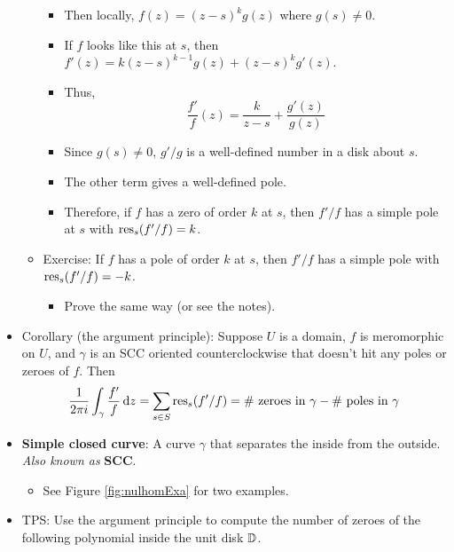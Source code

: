 \documentclass[../notes.tex]{subfiles}
\begin{document}
\begin{itemize}
\begin{itemize}
        \begin{itemize}
            \item Then locally, $f(z)=(z-s)^kg(z)$ where $g(s)\neq 0$.
            \item If $f$ looks like this at $s$, then $f'(z)=k(z-s)^{k-1}g(z)+(z-s)^kg'(z)$.
            \item Thus,
            \begin{equation*}
                \frac{f'}{f}(z) = \frac{k}{z-s}+\frac{g'(z)}{g(z)}
            \end{equation*}
            \item Since $g(s)\neq 0$, $g'/g$ is a well-defined number in a disk about $s$.
            \item The other term gives a well-defined pole.
            \item Therefore, if $f$ has a zero of order $k$ at $s$, then $f'/f$ has a simple pole at $s$ with $\operatorname{res}_s(f'/f)=k$.
        \end{itemize}
        \item Exercise: If $f$ has a pole of order $k$ at $s$, then $f'/f$ has a simple pole with $\operatorname{res}_s(f'/f)=-k$.
        \begin{itemize}
            \item Prove the same way (or see the notes).
        \end{itemize}
    \end{itemize}
    \item Corollary (the argument principle): Suppose $U$ is a domain, $f$ is meromorphic on $U$, and $\gamma$ is an SCC oriented counterclockwise that doesn't hit any poles or zeroes of $f$. Then
    \begin{equation*}
        \frac{1}{2\pi i}\int_\gamma\frac{f'}{f}\dd{z} = \sum_{s\in S}\operatorname{res}_s(f'/f)
        = \#\text{ zeroes in }\gamma-\#\text{ poles in }\gamma
    \end{equation*}
    \item \textbf{Simple closed curve}: A curve $\gamma$ that separates the inside from the outside. \emph{Also known as} \textbf{SCC}.
    \begin{itemize}
        \item See Figure \ref{fig:nulhomExa} for two examples.
    \end{itemize}
    \item TPS: Use the argument principle to compute the number of zeroes of the following polynomial inside the unit disk $\mathbb{D}$.
    \begin{equation*}

\end{equation*}
\end{itemize}
\end{document}
